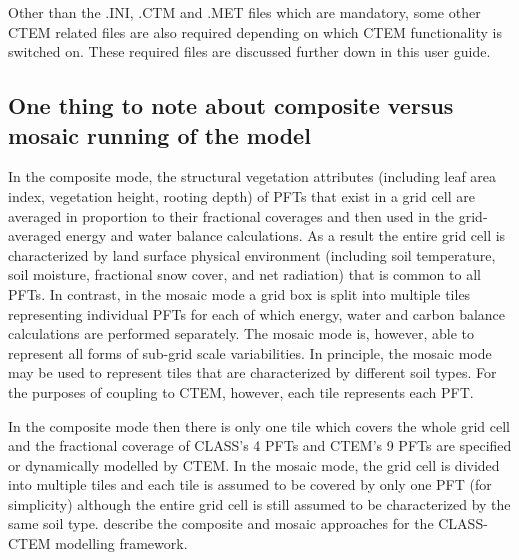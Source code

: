 Other than the .I\+N\+I, .C\+T\+M and .M\+E\+T files which are mandatory, some other C\+T\+E\+M related files are also required depending on which C\+T\+E\+M functionality is switched on. These required files are discussed further down in this user guide.\hypertarget{index_compvsmosaic}{}\subsection{One thing to note about composite versus mosaic running of the model}\label{index_compvsmosaic}
In the composite mode, the structural vegetation attributes (including leaf area index, vegetation height, rooting depth) of P\+F\+Ts that exist in a grid cell are averaged in proportion to their fractional coverages and then used in the grid-\/averaged energy and water balance calculations. As a result the entire grid cell is characterized by land surface physical environment (including soil temperature, soil moisture, fractional snow cover, and net radiation) that is common to all P\+F\+Ts. In contrast, in the mosaic mode a grid box is split into multiple tiles representing individual P\+F\+Ts for each of which energy, water and carbon balance calculations are performed separately. The mosaic mode is, however, able to represent all forms of sub-\/grid scale variabilities. In principle, the mosaic mode may be used to represent tiles that are characterized by different soil types. For the purposes of coupling to C\+T\+E\+M, however, each tile represents each P\+F\+T.

In the composite mode then there is only one tile which covers the whole grid cell and the fractional coverage of C\+L\+A\+S\+S’s 4 P\+F\+Ts and C\+T\+E\+M’s 9 P\+F\+Ts are specified or dynamically modelled by C\+T\+E\+M. In the mosaic mode, the grid cell is divided into multiple tiles and each tile is assumed to be covered by only one P\+F\+T (for simplicity) although the entire grid cell is still assumed to be characterized by the same soil type. \cite{Melton2016-zx} describe the composite and mosaic approaches for the C\+L\+A\+S\+S-\/\+C\+T\+E\+M modelling framework.

